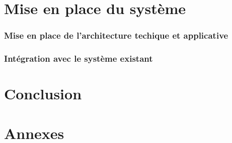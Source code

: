 \documentclass{mise_en_page}
\begin{document}
\section{Mise en place du système}

\subsubsection{Mise en place de l'architecture techique et applicative}

\subsubsection{Intégration avec le système existant}

\section{Conclusion}

\section{Annexes}
\end{document}
